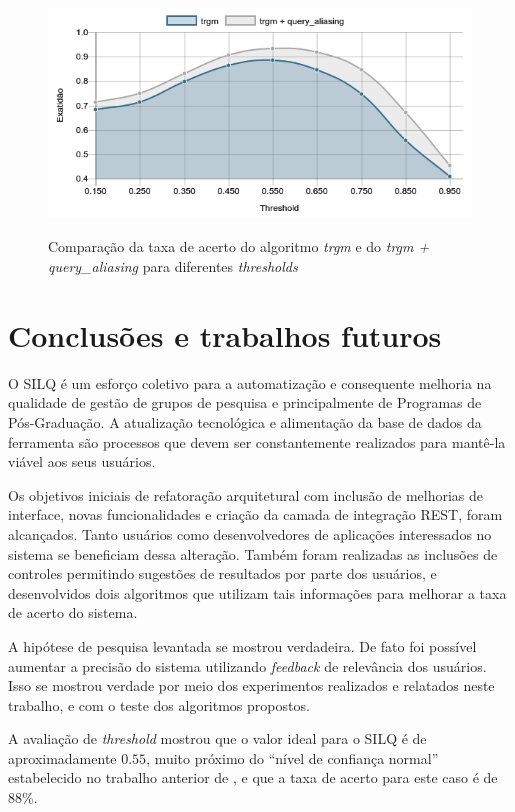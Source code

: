 \documentclass[12pt]{article}
\newcommand{\quotes}[1]{``#1''}
\begin{document}
\begin{figure}[!h]
   \centering
   \caption{Comparação da taxa de acerto do algoritmo \textit{trgm} e do \textit{trgm + query\_aliasing} para diferentes \textit{thresholds}}
   \includegraphics[width=\textwidth]{../figuras/avaliacao-algoritmos.png}
   \label{fig:avaliacao-algoritmos}
\end{figure}

\section{Conclusões e trabalhos futuros}

O SILQ é um esforço coletivo para a automatização e consequente melhoria na qualidade de gestão de grupos de pesquisa e principalmente de Programas de Pós-Graduação. A atualização tecnológica e alimentação da base de dados da ferramenta são processos que devem ser constantemente realizados para mantê-la viável aos seus usuários.

Os objetivos iniciais de refatoração arquitetural com inclusão de melhorias de interface, novas funcionalidades e criação da camada de integração REST, foram alcançados. Tanto usuários como desenvolvedores de aplicações interessados no sistema se beneficiam dessa alteração. Também foram realizadas as inclusões de controles permitindo sugestões de resultados por parte dos usuários, e desenvolvidos dois algoritmos que utilizam tais informações para melhorar a taxa de acerto do sistema.

A hipótese de pesquisa levantada se mostrou verdadeira. De fato foi possível aumentar a precisão do sistema utilizando \textit{feedback} de relevância dos usuários. Isso se mostrou verdade por meio dos experimentos realizados e relatados neste trabalho, e com o teste dos algoritmos propostos.

A avaliação de \textit{threshold} mostrou que o valor ideal para o SILQ é de aproximadamente $0.55$, muito próximo do \quotes{nível de confiança normal} estabelecido no trabalho anterior de \cite{Silq1}, e que a taxa de acerto para este caso é de 88\%.
\end{document}
